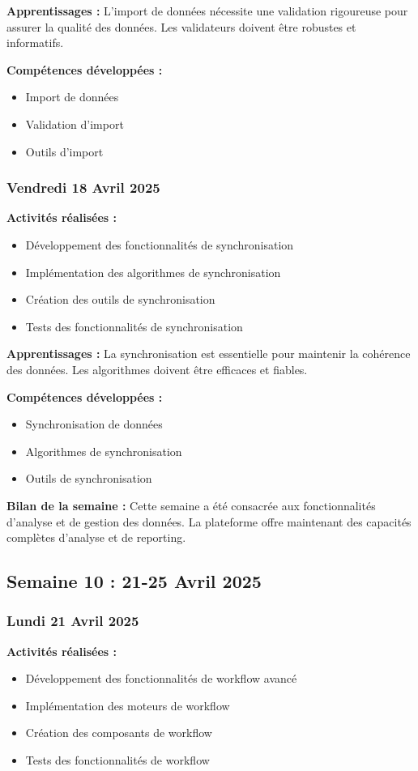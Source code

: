 \documentclass[12pt,a4paper]{article}
\begin{document}
\textbf{Apprentissages :}
L'import de données nécessite une validation rigoureuse pour assurer la qualité des données. Les validateurs doivent être robustes et informatifs.

\textbf{Compétences développées :}
\begin{itemize}
    \item Import de données
    \item Validation d'import
    \item Outils d'import
\end{itemize}

\subsubsection{Vendredi 18 Avril 2025}
\textbf{Activités réalisées :}
\begin{itemize}
    \item Développement des fonctionnalités de synchronisation
    \item Implémentation des algorithmes de synchronisation
    \item Création des outils de synchronisation
    \item Tests des fonctionnalités de synchronisation
\end{itemize}

\textbf{Apprentissages :}
La synchronisation est essentielle pour maintenir la cohérence des données. Les algorithmes doivent être efficaces et fiables.

\textbf{Compétences développées :}
\begin{itemize}
    \item Synchronisation de données
    \item Algorithmes de synchronisation
    \item Outils de synchronisation
\end{itemize}

\textbf{Bilan de la semaine :}
Cette semaine a été consacrée aux fonctionnalités d'analyse et de gestion des données. La plateforme offre maintenant des capacités complètes d'analyse et de reporting.

\clearpage
\subsection{Semaine 10 : 21-25 Avril 2025}

\subsubsection{Lundi 21 Avril 2025}
\textbf{Activités réalisées :}
\begin{itemize}
    \item Développement des fonctionnalités de workflow avancé
    \item Implémentation des moteurs de workflow
    \item Création des composants de workflow
    \item Tests des fonctionnalités de workflow
\end{itemize}
\end{document}
